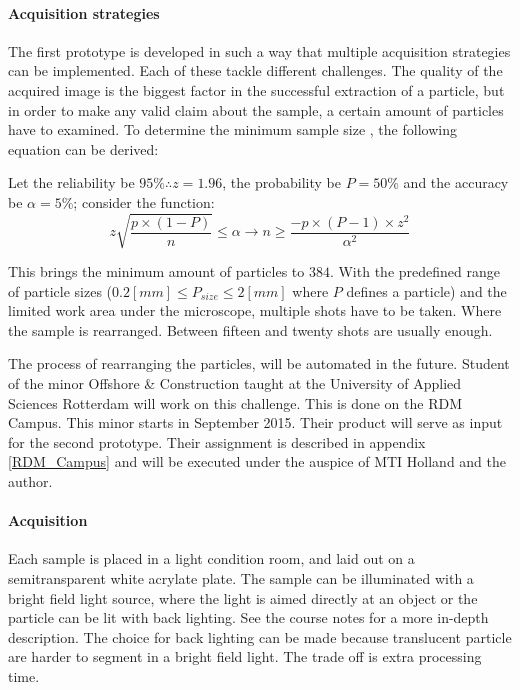 \documentclass[11pt,fleqn,,a4paper,twoside,openright]{book}
\begin{document}
\paragraph{Acquisition strategies}The first prototype is developed in such a way that multiple acquisition strategies can be implemented. Each of these tackle different challenges. The quality of the acquired image is the biggest factor in the successful extraction of a particle, but in order to make any valid claim about the sample, a certain amount of particles have to examined. To determine the minimum sample size , the following equation can be derived:
\begin{sBox}
	Let the reliability be $95\% \therefore z=1.96$, the probability be $P=50\%$ and the accuracy be $\alpha=5\%$; consider the function:
	\begin{equation}
	z\sqrt{\frac{p\times(1-P)}{n}}\leq\alpha \rightarrow n\geq\frac{-p\times(P-1)\times z^2}{\alpha^2}
	\end{equation}
\end{sBox}
This brings the minimum amount of particles to $384$. With the predefined range of particle sizes ($0.2[mm]\leq P_{size} \leq 2[mm]$ where $P$ defines a particle) and the limited work area under the microscope, multiple shots have to be taken. Where the sample is rearranged. Between fifteen and twenty shots are usually enough.
\begin{remark}
	The process of rearranging the particles, will be automated in the future. Student of the minor Offshore \& Construction taught at the University of Applied Sciences Rotterdam will work on this challenge. This is done on the RDM Campus. This minor starts in September 2015. Their product will serve as input for the second prototype. Their assignment is described in appendix \ref{RDM_Campus} and will be executed under the auspice of MTI Holland and the author.
\end{remark}

\paragraph{Acquisition}  Each sample is placed in a light condition room, and laid out on a semitransparent white acrylate plate. The sample can be illuminated with a bright field light source, where the light is aimed directly at an object or the particle can be lit with back lighting. See the course notes \cite{ypma_course_2014} for a more in-depth description. The choice for back lighting can be made because translucent particle are harder to segment in a bright field light. The trade off is extra processing time.
\end{document}
